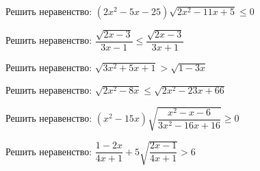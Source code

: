 \begin{class}[number=3]
\begin{listofex}
		\item Решить неравенство: \( (2x^2-5x-25)\sqrt{2x^2-11x+5}\le0 \)
		\item Решить неравенство: \( \dfrac{\sqrt{2x-3}}{3x-1}\le\dfrac{\sqrt{2x-3}}{3x+1} \)
		\item Решить неравенство: \( \sqrt{3x^2+5x+1}>\sqrt{1-3x} \)
		\item Решить неравенство: \( \sqrt{2x^2-8x}\le\sqrt{2x^2-23x+66} \)
		\item Решить неравенство: \( (x^2-15x)\sqrt{\dfrac{x^2-x-6}{3x^2-16x+16}}\ge0 \)
		\item Решить неравенство: \( \dfrac{1-2x}{4x+1}+5\sqrt{\dfrac{2x-1}{4x+1}}>6 \)
	\end{listofex}
\end{class}

